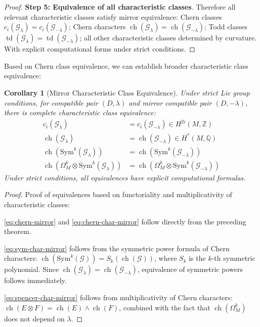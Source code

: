 \documentclass[a4paper,12pt]{extarticle}
\newtheorem{corollary}[theorem]{Corollary}
\newcommand{\ch}{\operatorname{ch}}
\newcommand{\td}{\operatorname{td}}
\theoremstyle{definition}
\begin{document}
\begin{proof}
\textbf{Step 5: Equivalence of all characteristic classes}. Therefore all relevant characteristic classes satisfy mirror equivalence: Chern classes $c_i(\mathcal{G}_{\lambda}) = c_i(\mathcal{G}_{-\lambda})$; Chern characters $\ch(\mathcal{G}_{\lambda}) = \ch(\mathcal{G}_{-\lambda})$; Todd classes $\td(\mathcal{G}_{\lambda}) = \td(\mathcal{G}_{-\lambda})$; all other characteristic classes determined by curvature. With explicit computational forms under strict conditions.
\end{proof}

Based on Chern class equivalence, we can establish broader characteristic class equivalence:

\begin{corollary}[Mirror Characteristic Class Equivalence]
Under strict Lie group conditions, for compatible pair $(D,\lambda)$ and mirror compatible pair $(D,-\lambda)$, there is complete characteristic class equivalence:
\begin{align}
c_i(\mathcal{G}_{\lambda}) &= c_i(\mathcal{G}_{-\lambda}) \in H^{2i}(M,\mathbb{Z}) \label{eq:chern-mirror}\\
\ch(\mathcal{G}_{\lambda}) &= \ch(\mathcal{G}_{-\lambda}) \in H^{*}(M,\mathbb{Q}) \label{eq:chern-char-mirror}\\
\ch(\mathrm{Sym}^k(\mathcal{G}_{\lambda})) &= \ch(\mathrm{Sym}^k(\mathcal{G}_{-\lambda})) \label{eq:sym-char-mirror}\\
\ch(\Omega^k_M \otimes \mathrm{Sym}^k(\mathcal{G}_{\lambda})) &= \ch(\Omega^k_M \otimes \mathrm{Sym}^k(\mathcal{G}_{-\lambda})) \label{eq:spencer-char-mirror}
\end{align}
Under strict conditions, all equivalences have explicit computational formulas.
\end{corollary}

\begin{proof}
Proof of equivalences based on functoriality and multiplicativity of characteristic classes:

\eqref{eq:chern-mirror} and \eqref{eq:chern-char-mirror} follow directly from the preceding theorem.

\eqref{eq:sym-char-mirror} follows from the symmetric power formula of Chern characters: $\ch(\mathrm{Sym}^k(\mathcal{G})) = S_k(\ch(\mathcal{G}))$, where $S_k$ is the $k$-th symmetric polynomial. Since $\ch(\mathcal{G}_{\lambda}) = \ch(\mathcal{G}_{-\lambda})$, equivalence of symmetric powers follows immediately.

\eqref{eq:spencer-char-mirror} follows from multiplicativity of Chern characters: $\ch(E \otimes F) = \ch(E) \wedge \ch(F)$, combined with the fact that $\ch(\Omega^k_M)$ does not depend on $\lambda$.
\end{proof}
\end{document}
